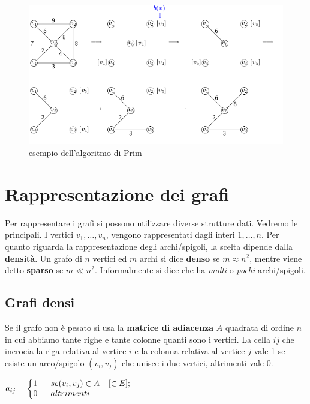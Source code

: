 \documentclass[11pt]{book}
\makeatletter
\newenvironment{sistema}%
{\left\lbrace\begin{array}{@{}l@{}}}%
{\end{array}\right.}
\makeatother
\begin{document}
\begin{figure}[h!]
  \centering
  \includegraphics[width=\textwidth]{images/cap7fig73.png}
  \caption{esempio dell'algoritmo di Prim}
  \label{cap7fig73}
\end{figure}

\section{Rappresentazione dei grafi}

Per rappresentare i grafi si possono utilizzare diverse strutture
dati. Vedremo le principali. I vertici $v_1, \dots, v_n$, vengono
rappresentati dagli interi $1, \dots, n$. Per quanto riguarda la
rappresentazione degli archi/spigoli, la scelta dipende dalla {\bf
  densit\`a}. Un grafo di $n$ vertici ed $m$ archi si dice {\bf denso}
se $m \approx n^2$, mentre viene detto {\bf sparso} se $m \ll
n^2$. Informalmente si dice che ha {\em molti} o {\em pochi}
archi/spigoli.

\subsection{Grafi densi}

Se il grafo non \`e pesato si usa la {\bf matrice di adiacenza} $A$
quadrata di ordine $n$ in cui abbiamo tante righe e tante colonne
quanti sono i vertici. La cella $ij$ che incrocia la riga relativa al
vertice $i$ e la colonna relativa al vertice $j$ vale 1 se esiste un
arco/spigolo $(v_i, v_j)$ che unisce i due vertici, altrimenti vale 0.

\begin{center}
$a_{ij} = 
\begin{sistema}
1\phantom{aaa} se (v_i, v_j) \in A\phantom{aa}[\in E];\\
0\phantom{aaa} altrimenti
\end{sistema}
$
\end{center}
\end{document}
